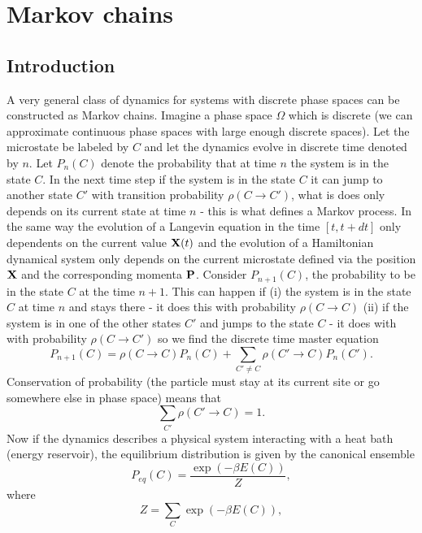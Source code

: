 \documentclass[11pt]{report}
\begin{document}
 \chapter{Markov chains}
 \section{Introduction}
 A very general class of dynamics for systems with discrete phase spaces can be constructed as Markov chains. Imagine a phase space $\Omega$ which is discrete 
 (we can approximate continuous phase spaces with large enough discrete spaces).
 Let the microstate be labeled by $C$ and let the dynamics evolve in discrete time denoted
 by $n$. Let $P_n(C)$ denote the probability that at time $n$ the system is in the state
 $C$. In the next time step if the system is in the state $C$ it can jump to another state $C'$ with transition probability $\rho(C\to C')$, what is does only depends on its current state at time $n$ - this is what defines a Markov process. In the same way the evolution of a Langevin equation
in the time $[t,t+dt]$ only dependents on the current value ${\bf X}(t)$ and the evolution of a Hamiltonian dynamical system only depends on the current  microstate defined via the position ${\bf X}$ and the corresponding momenta ${\bf P}$. Consider $P_{n+1}(C)$, the probability to be in the state $C$ at the time $n+1$. This can happen if (i) the system is
in the state $C$ at time $n$ and stays there - it does this with probability $\rho(C\to C)$ (ii)
if the system is in one of the other states $C'$ and jumps to the state $C$ - it does with with probability $\rho(C\to C')$ so we find the discrete time master equation
\begin{equation}
\boxed{
P_{n+1}(C) =  \rho(C\to C)P_n(C) + \sum_{C'\neq C} \rho(C'\to C)P_n(C').}
\end{equation}
Conservation of probability (the particle must stay at its current site or go somewhere else in phase space) means that
\begin{equation}
\sum_{C'} \rho(C' \to C) = 1.\label{norm}
\end{equation}
Now if the dynamics describes a physical system interacting with a heat bath (energy reservoir), the equilibrium distribution is given by the canonical ensemble
\begin{equation}
P_{eq}(C) = \frac{\exp(-\beta E(C))}{Z},
\end{equation}
where 
\begin{equation}
Z = \sum_C \exp(-\beta E(C)),
\end{equation}
\end{document}
